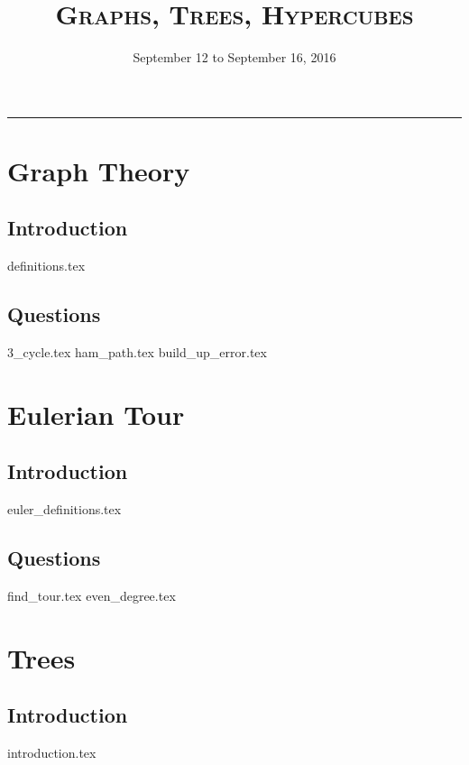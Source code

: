 \documentclass{exam}
\title{\textsc{Graphs, Trees, Hypercubes}}
\date{September 12 to September 16, 2016}
\begin{document}
\maketitle
\rule{\textwidth}{0.15em}
\fontsize{12}{15}\selectfont
\thispagestyle{empty}

\section{Graph Theory}
\subsection{Introduction}
\begin{questions}
{definitions.tex}
\end{questions}

\subsection{Questions}
\begin{questions}
{3_cycle.tex}
{ham_path.tex}
{build_up_error.tex}
\end{questions}

\section{Eulerian Tour}
\subsection{Introduction}
{euler_definitions.tex}
\subsection{Questions}
\begin{questions}
{find_tour.tex}
{even_degree.tex}
\end{questions}

\section{Trees}
\subsection{Introduction}
{introduction.tex}
\end{document}
